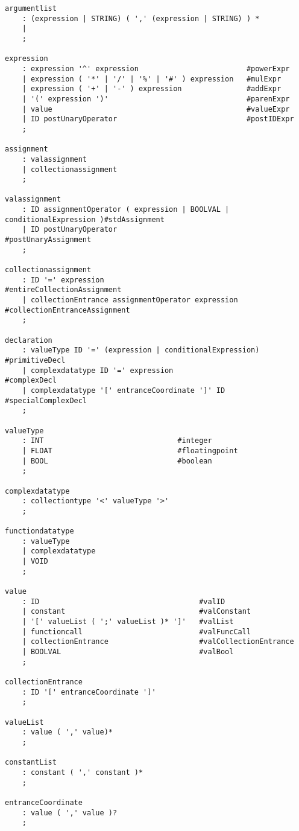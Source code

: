 \begin{lstlisting}[caption={\acrshort{cfg} and Lexing rules},frame=tlrb,numbers=none]
argumentlist
    : (expression | STRING) ( ',' (expression | STRING) ) *
    | 
    ;

expression
    : expression '^' expression                         #powerExpr
    | expression ( '*' | '/' | '%' | '#' ) expression   #mulExpr
    | expression ( '+' | '-' ) expression               #addExpr
    | '(' expression ')'                                #parenExpr
    | value                                             #valueExpr
    | ID postUnaryOperator                              #postIDExpr
    ;

assignment
    : valassignment
	| collectionassignment
    ;

valassignment
	: ID assignmentOperator ( expression | BOOLVAL | conditionalExpression )#stdAssignment
    | ID postUnaryOperator                                                  #postUnaryAssignment
	;

collectionassignment
	: ID '=' expression                                 #entireCollectionAssignment
	| collectionEntrance assignmentOperator expression  #collectionEntranceAssignment
	;
	
declaration
    : valueType ID '=' (expression | conditionalExpression) #primitiveDecl
    | complexdatatype ID '=' expression                     #complexDecl
    | complexdatatype '[' entranceCoordinate ']' ID         #specialComplexDecl
    ; 
    
valueType
    : INT                               #integer
    | FLOAT                             #floatingpoint
    | BOOL                              #boolean
    ;

complexdatatype
    : collectiontype '<' valueType '>'
    ;

functiondatatype
    : valueType
    | complexdatatype
    | VOID
    ;

value
    : ID                                     #valID
    | constant                               #valConstant
    | '[' valueList ( ';' valueList )* ']'   #valList
    | functioncall                           #valFuncCall
    | collectionEntrance                     #valCollectionEntrance
    | BOOLVAL                                #valBool
    ;

collectionEntrance
    : ID '[' entranceCoordinate ']'
    ;

valueList
    : value ( ',' value)*
    ;

constantList
    : constant ( ',' constant )*
    ;

entranceCoordinate
    : value ( ',' value )?
    ;


\end{lstlisting}
